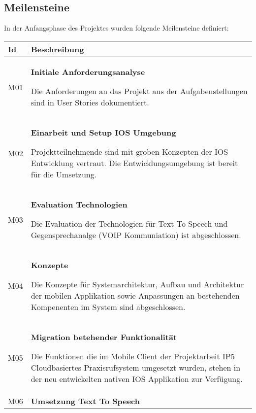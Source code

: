 \subsection*{Meilensteine}

In der Anfangsphase des Projektes wurden folgende Meilensteine definiert:

\begin{table}[h]
    \centering
    \begin{tabular}{|l|p{15cm}|}
        \hline
        \textbf{Id} & \textbf{Beschreibung}                                                                                                                                                                                         \\
        \hline

        M01         & \textbf{Initiale Anforderungsanalyse}

        Die Anforderungen an das Projekt aus der Aufgabenstellungen sind in User Stories dokumentiert.\\
        \hline

        M02         & \textbf{Einarbeit und Setup IOS Umgebung}

        Projektteilnehmende sind mit groben Konzepten der IOS Entwicklung vertraut.
        Die Entwicklungsumgebung ist bereit für die Umsetzung. \\
        \hline

        M03         & \textbf{Evaluation Technologien}

        Die Evaluation der Technologien für Text To Speech und Gegensprechanalge (VOIP Kommuniation) ist abgeschlossen. \\
        \hline

        M04         & \textbf{Konzepte}

        Die Konzepte für Systemarchitektur, Aufbau und Architektur der mobilen Applikation sowie Anpassungen
        an bestehenden Kompenenten im System sind abgeschlossen. \\
        \hline

        M05         & \textbf{Migration betehender Funktionalität}

        Die Funktionen die im Mobile Client der Projektarbeit IP5 Cloudbasiertes Praxisrufsystem umgesetzt wurden,
        stehen in der neu entwickelten nativen IOS Applikation zur Verfügung. \\
        \hline

        M06         & \textbf{Umsetzung Text To Speech}


\end{tabular}
\end{table}
